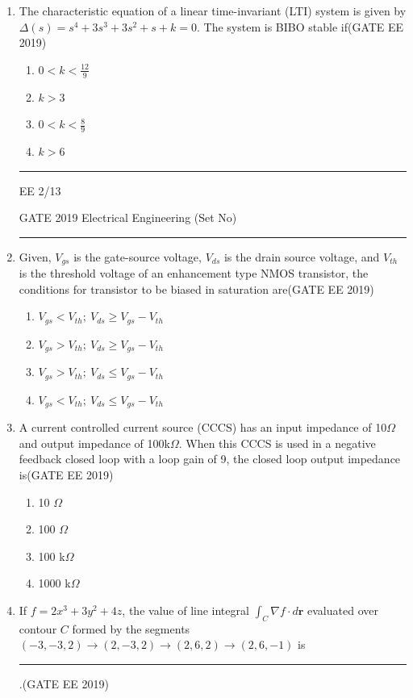 \documentclass[a4paper,10pt]{exam}
\theoremstyle{remark}
\begin{document}
\begin{enumerate}
\begin{enumerate}[label=\arabic*.]
\item The characteristic equation of a linear time-invariant (LTI) system is given by
$\Delta(s) = s^4 + 3s^3 + 3s^2 + s + k = 0.
$
The system is BIBO stable if\hfill{(GATE EE 2019)}
\begin{multicols}{4}
\begin{enumerate}
    \item $0 < k < \frac{12}{9}$
    \item $k > 3$
    \item $0 < k < \frac{8}{9}$
    \item $k > 6$
\end{enumerate}
\end{multicols}
\vfill
\noindent\rule{\linewidth}{0.4pt}
EE \hfill 2/13
\newpage
\raggedright{GATE 2019 Electrical Engineering (Set No)}
\noindent\rule{\linewidth}{0.4pt}

\item Given, $ V_{gs}$ is the gate-source voltage, $V_{ds}$ is the drain source voltage, and $V_{th}$ is the threshold voltage of an enhancement type NMOS transistor, the conditions for transistor to be biased in saturation are\hfill{(GATE EE 2019)}
\begin{enumerate}
    \item $ V_{gs} < V_{th} ;\  V_{ds} \geq V_{gs} - V_{th} $
    \item $ V_{gs} >  V_{th} ;\  V_{ds} \geq V_{gs} - V_{th} $
    \item $ V_{gs} > V_{th} ;\  V_{ds} \leq V_{gs} - V_{th} $
    \item $ V_{gs} < V_{th} ;\  V_{ds} \leq V_{gs} - V_{th} $
\end{enumerate}

\item A current controlled current source (CCCS) has an input impedance of 10$\Omega$ and output impedance of 100k$\Omega$. When this CCCS is used in a negative feedback closed loop with a loop gain of 9, the closed loop output impedance is\hfill{(GATE EE 2019)}
\begin{multicols}{4}
\begin{enumerate}
    \item 10 $\Omega$
    \item 100 $\Omega$
    \item 100 k$\Omega$
    \item 1000 k$\Omega$
\end{enumerate}
\end{multicols}

\item If $f = 2x^3 + 3y^2 + 4z $, the value of line integral $\int_C \nabla f \cdot d\mathbf{r}$ evaluated over contour $C$ formed by the segments $(-3, -3, 2) \to (2, -3, 2) \to (2, 6, 2) \to (2, 6, -1)$ is \rule{2cm}{0.15mm}.\hfill{(GATE EE 2019)}


\end{enumerate}
\end{enumerate}
\end{document}
